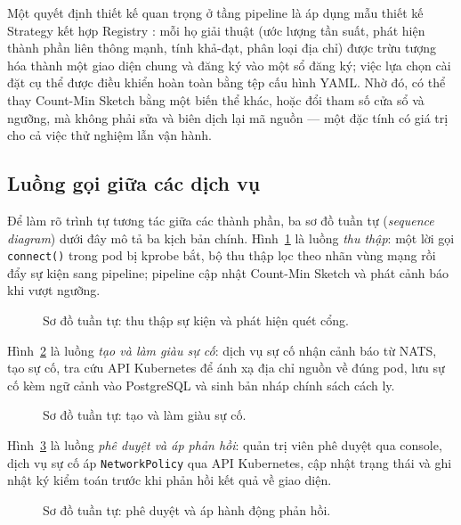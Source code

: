 Một quyết định thiết kế quan trọng ở tầng pipeline là áp dụng mẫu thiết kế Strategy
kết hợp Registry \cite{gamma1995patterns}: mỗi họ giải thuật (ước lượng tần suất, phát
hiện thành phần liên thông mạnh, tính khả-đạt, phân loại địa chỉ) được trừu tượng hóa
thành một giao diện chung và đăng ký vào một sổ đăng ký; việc lựa chọn cài đặt cụ thể
được điều khiển hoàn toàn bằng tệp cấu hình YAML. Nhờ đó, có thể thay Count-Min Sketch
bằng một biến thể khác, hoặc đổi tham số cửa sổ và ngưỡng, mà không phải sửa và biên
dịch lại mã nguồn --- một đặc tính có giá trị cho cả việc thử nghiệm lẫn vận hành.

\subsection{Luồng gọi giữa các dịch vụ}
\label{subsec:sequences}

Để làm rõ trình tự tương tác giữa các thành phần, ba sơ đồ tuần tự (\textit{sequence
diagram}) dưới đây mô tả ba kịch bản chính. Hình~\ref{fig:seq-ingestion} là luồng
\emph{thu thập}: một lời gọi \texttt{connect()} trong pod bị kprobe bắt, bộ thu thập lọc
theo nhãn vùng mạng rồi đẩy sự kiện sang pipeline; pipeline cập nhật Count-Min Sketch và
phát cảnh báo khi vượt ngưỡng.

\begin{figure}[H]
  \centering
  \resizebox{0.86\linewidth}{!}{}
  \caption{Sơ đồ tuần tự: thu thập sự kiện và phát hiện quét cổng.}
  \label{fig:seq-ingestion}
\end{figure}

Hình~\ref{fig:seq-incident} là luồng \emph{tạo và làm giàu sự cố}: dịch vụ sự cố nhận
cảnh báo từ NATS, tạo sự cố, tra cứu API Kubernetes để ánh xạ địa chỉ nguồn về đúng pod,
lưu sự cố kèm ngữ cảnh vào PostgreSQL và sinh bản nháp chính sách cách ly.

\begin{figure}[H]
  \centering
  \resizebox{0.86\linewidth}{!}{}
  \caption{Sơ đồ tuần tự: tạo và làm giàu sự cố.}
  \label{fig:seq-incident}
\end{figure}

Hình~\ref{fig:seq-response} là luồng \emph{phê duyệt và áp phản hồi}: quản trị viên phê
duyệt qua console, dịch vụ sự cố áp \texttt{NetworkPolicy} qua API Kubernetes, cập nhật
trạng thái và ghi nhật ký kiểm toán trước khi phản hồi kết quả về giao diện.

\begin{figure}[H]
  \centering
  \resizebox{0.96\linewidth}{!}{}
  \caption{Sơ đồ tuần tự: phê duyệt và áp hành động phản hồi.}
  \label{fig:seq-response}
\end{figure}

